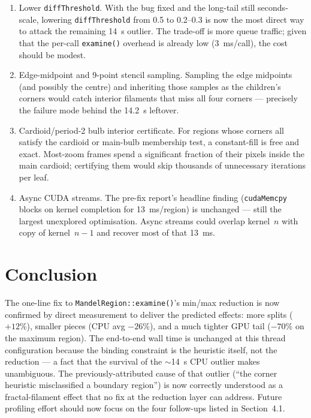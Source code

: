 \documentclass[
	english,
	letterpaper, oneside
]{article}
\begin{document}
\begin{enumerate}
    \item Lower \texttt{diffThreshold}. With the bug fixed and
    the long-tail still seconds-scale, lowering \texttt{diffThreshold}
    from 0.5 to 0.2--0.3 is now the most direct way to attack the
    remaining 14~s outlier. The trade-off is more queue traffic; given
    that the per-call \texttt{examine()} overhead is already low
    (3~ms/call), the cost should be modest.
    \item Edge-midpoint and 9-point stencil sampling.
    Sampling the edge midpoints (and possibly the centre) and inheriting
    those samples as the children's corners would catch interior
    filaments that miss all four corners --- precisely the failure mode
    behind the 14.2~s leftover.
    \item Cardioid/period-2 bulb interior certificate. For
    regions whose corners all satisfy the cardioid or main-bulb
    membership test, a constant-fill is free and exact. Most-zoom
    frames spend a significant fraction of their pixels inside the main
    cardioid; certifying them would skip thousands of unnecessary
    iterations per leaf.
    \item Async CUDA streams. The pre-fix report's headline
    finding (\texttt{cudaMemcpy} blocks on kernel completion for
    13~ms/region) is unchanged --- still the largest unexplored
    optimisation. Async streams could overlap kernel~$n$ with copy of
    kernel~$n{-}1$ and recover most of that 13~ms.
\end{enumerate}

\section{Conclusion}

The one-line fix to \texttt{MandelRegion::examine()}'s min/max
reduction is now confirmed by direct measurement to deliver the
predicted effects: more splits ($+12$\%), smaller pieces (CPU avg
$-26$\%), and a much tighter GPU tail ($-70$\% on the maximum
region). The end-to-end wall time is unchanged at this thread
configuration because the binding constraint is the heuristic itself,
not the reduction --- a fact that the survival of the $\sim$14~s CPU
outlier makes unambiguous. The previously-attributed cause of that
outlier (``the corner heuristic misclassified a boundary region'') is
now correctly understood as a fractal-filament effect that no fix at
the reduction layer can address. Future profiling effort should now
focus on the four follow-ups listed in Section~4.1.
\end{document}
